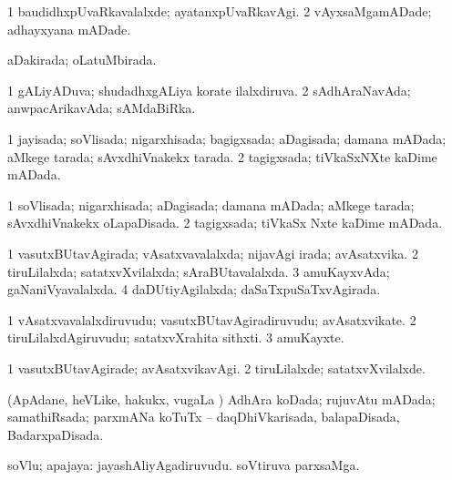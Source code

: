 \bentry
{} 
\gl{\kirxvi}
\bmng
\bnum
\num{1} baudidhxpUvaRkavalalxde; ayatanxpUvaRkavAgi. 
\num{2} vAyxsaMgamADade; adhayxyana mADade. 
\enum
\emng
\eentry

\bentry
{} 
\gl{\gu}
\expl{}
\bmng
aDakirada; oLatuMbirada. 
\emng
\eentry

\bentry
{} 
\gl{\gu}
\expl{}
\bmng
\bnum
\num{1} gALiyADuva; shudadhxgALiya korate ilalxdiruva. 
\num{2} sAdhAraNavAda; anwpacArikavAda; sAMdaBiRka. 
\enum
\emng
\eentry

\bentry
{} 
\gl{\gu}
\expl{}
\bmng
\bnum
\num{1} jayisada; soVlisada; nigarxhisada; bagigxsada; aDagisada; damana mADada; aMkege tarada; sAvxdhiVnakekx tarada. 
\num{2} tagigxsada; tiVkaSxNXte kaDime mADada. 
\enum
\emng
\eentry

\bentry
{} 
\gl{\gu}
\expl{}
\bmng
\bnum
\num{1} soVlisada; nigarxhisada; aDagisada; damana mADada; aMkege tarada; sAvxdhiVnakekx oLapaDisada. 
\num{2} tagigxsada; tiVkaSx Nxte kaDime mADada. 
\enum
\emng
\eentry

\bentry
{} 
\gl{\gu}
\expl{}
\bmng
\bnum
\num{1} vasutxBUtavAgirada; vAsatxvavalalxda; nijavAgi irada; avAsatxvika. 
\num{2} tiruLilalxda; satatxvXvilalxda; sAraBUtavalalxda. 
\num{3} amuKayxvAda; gaNaniVyavalalxda. 
\num{4} daDUtiyAgilalxda; daSaTxpuSaTxvAgirada. 
\enum
\emng
\eentry

\bentry
{} 
\gl{\nA}
\expl{}
\bmng
\bnum
\num{1} vAsatxvavalalxdiruvudu; vasutxBUtavAgiradiruvudu; avAsatxvikate. 
\num{2} tiruLilalxdAgiruvudu; satatxvXrahita sithxti. 
\num{3} amuKayxte. 
\enum
\emng
\eentry

\bentry
{} 
\gl{\kirxvi}
\expl{}
\bmng
\bnum
\num{1} vasutxBUtavAgirade; avAsatxvikavAgi. 
\num{2} tiruLilalxde; satatxvXvilalxde. 
\enum
\emng
\eentry

\bentry
{} 
\gl{\gu}
\expl{}
\bmng
(ApAdane, heVLike, hakukx, \mo vugaLa \vi) AdhAra koDada; rujuvAtu mADada; samathiRsada; parxmANa koTuTx -- daqDhiVkarisada, balapaDisada, BadarxpaDisada. 
\emng
\eentry

\bentry
{} 
\gl{\nA}
\expl{}
\bmng
soVlu; apajaya: 
\banum
{} jayashAliyAgadiruvudu. 
 soVtiruva parxsaMga. 
\eanum
\emng
\eentry

